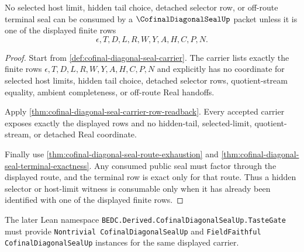 \begin{theorem}
\label{thm:cofinal-diagonal-seal-hidden-selector-refusal}
No selected host limit, hidden tail choice, detached selector row, or off-route terminal seal can be consumed by a $\CofinalDiagonalSealUp$ packet unless it is one of the displayed finite rows
$$
\epsilon,T,D,L,R,W,Y,A,H,C,P,N.
$$
\end{theorem}
\begin{proof}
Start from \autoref{def:cofinal-diagonal-seal-carrier}. The carrier lists exactly the finite rows $\epsilon,T,D,L,R,W,Y,A,H,C,P,N$ and explicitly has no coordinate for selected host limits, hidden tail choice, detached selector rows, quotient-stream equality, ambient completeness, or off-route Real handoffs.

Apply \autoref{thm:cofinal-diagonal-seal-carrier-row-readback}. Every accepted carrier exposes exactly the displayed rows and no hidden-tail, selected-limit, quotient-stream, or detached Real coordinate.

Finally use \autoref{thm:cofinal-diagonal-seal-route-exhaustion} and \autoref{thm:cofinal-diagonal-seal-terminal-exactness}. Any consumed public seal must factor through the displayed route, and the terminal row is exact only for that route. Thus a hidden selector or host-limit witness is consumable only when it has already been identified with one of the displayed finite rows.
\end{proof}

The later Lean namespace \texttt{BEDC.Derived.CofinalDiagonalSealUp.TasteGate} must provide \texttt{Nontrivial CofinalDiagonalSealUp} and \texttt{FieldFaithful CofinalDiagonalSealUp} instances for the same displayed carrier.

